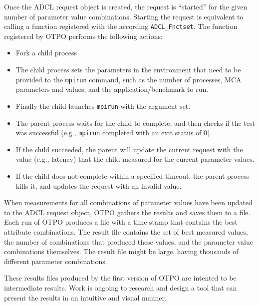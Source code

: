 Once the ADCL request object is created, the request is ``started''
for the given number of parameter value combinations.  Starting the
request is equivalent to calling a function registered with the
according {\tt ADCL\_\-Fnctset}. The function registered by OTPO
performs the following actions:
\begin{itemize}
\item Fork a child process
\item The child process sets the parameters in the environment that
  need to be provided to the {\tt mpirun} command, such as the number
  of processes, MCA parameters and values, and the
  application/benchmark to run.
\item Finally the child launches {\tt mpirun} with the argument set.
\item The parent process waits for the child to complete, and then
  checks if the test was successful (e.g., {\tt mpirun} completed with
  an exit status of 0).
\item If the child succeeded, the parent will update the current
  request with the value (e.g., latency) that the child measured for
  the current parameter values.
\item If the child does not complete within a specified timeout, the
  parent process kills it, and updates the request with an invalid
  value.
\end{itemize}

When measurements for all combinations of parameter values have been
updated to the ADCL request object, OTPO gathers the results and saves
them to a file. Each run of OTPO produces a file with a time stamp
that contains the best attribute combinations. The result file
contains the set of best measured values, the number of combinations
that produced these values, and the parameter value combinations
themselves. The result file might be large, having thousands of
different parameter combinations.

These results files produced by the first version of OTPO are intented
to be intermediate results.  Work is ongoing to research and design a
tool that can present the results in an intuitive and visual manner.

